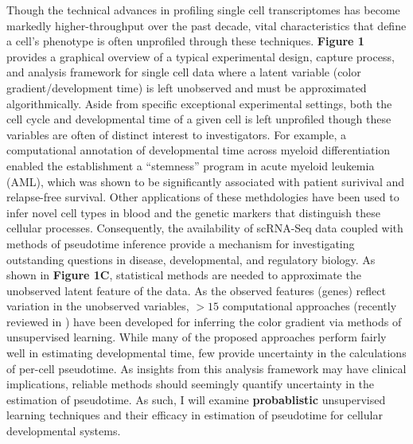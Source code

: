 \documentclass[english, 11pt]{article}\usepackage[]{graphicx}\usepackage[]{color}
\begin{document}
Though the technical advances in profiling single cell transcriptomes has become markedly higher-throughput over the past decade, vital characteristics that define a cell's phenotype is often unprofiled through these techniques. \textbf{Figure 1} provides a graphical overview of a typical experimental design, capture process, and analysis framework for single cell data where a latent variable (color gradient/development time) is left unobserved and must be approximated algorithmically. Aside from specific exceptional experimental settings, both the cell cycle and developmental time of a given cell is left unprofiled though these variables are often of distinct interest to investigators. For example, a computational annotation of developmental time across myeloid differentiation enabled the establishment a ``stemness'' program in acute myeloid leukemia (AML), which was shown to be significantly associated with patient surivival and relapse-free survival. \cite{corces2016lineage} Other applications of these methdologies have been used to infer novel cell types in blood \cite{buenrostro2017single} and the genetic markers that distinguish these cellular processes. Consequently, the availability of scRNA-Seq data coupled with methods of pseudotime inference provide a mechanism for investigating outstanding questions in disease, developmental, and regulatory biology.  \newline \newline
\noindent As shown in \textbf{Figure 1C}, statistical methods are needed to approximate the unobserved latent feature of the data. As the observed features (genes) reflect variation in the unobserved variables, $>15$ computational approaches (recently reviewed in \cite{cannoodt2016computational}) have been developed for inferring the color gradient via methods of unsupervised learning. While many of the proposed approaches perform fairly well in estimating developmental time, few provide uncertainty in the calculations of per-cell pseudotime. As insights from this analysis framework may have clinical \cite{corces2016lineage} implications, reliable methods should seemingly quantify uncertainty in the estimation of pseudotime. As such, I will examine \textbf{probablistic} unsupervised learning techniques and their efficacy in estimation of pseudotime for cellular developmental systems.
\end{document}
